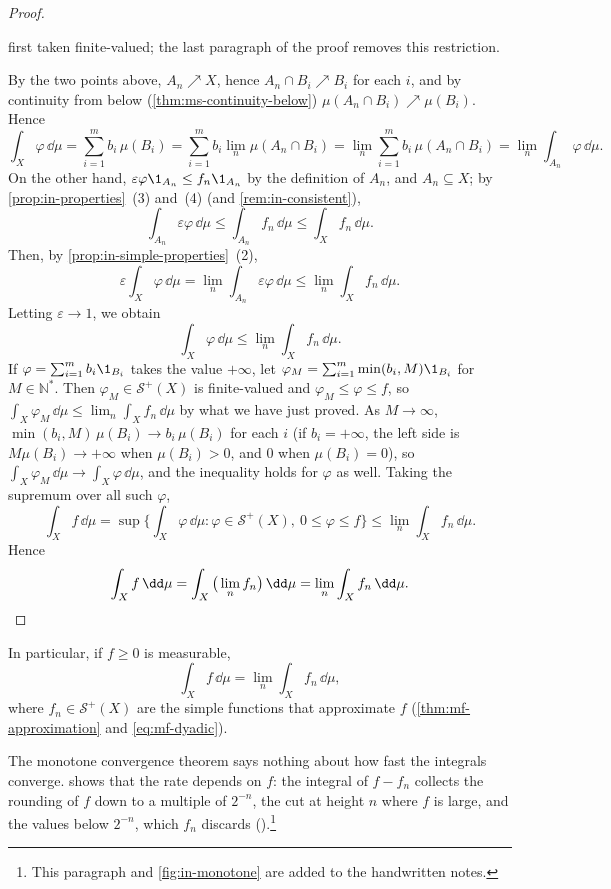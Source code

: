 \begin{proof}
\begin{itemize}
{    first taken finite-valued; the last paragraph of the proof removes this restriction.}
\end{itemize}
By the two points above, $A_n\nearrow X$, hence $A_n\cap B_i\nearrow B_i$ for each $i$, and by
continuity from below (\cref{thm:ms-continuity-below}) $\mu(A_n\cap B_i)\nearrow\mu(B_i)$. Hence
\[
  \int_X\varphi\,\dd\mu=\sum_{i=1}^mb_i\,\mu(B_i)=\sum_{i=1}^mb_i\lim_n\mu(A_n\cap B_i)
  =\lim_n\sum_{i=1}^mb_i\,\mu(A_n\cap B_i)=\lim_n\int_{A_n}\varphi\,\dd\mu .
\]
On the other hand, $\varepsilon\varphi\1_{A_n}\le f_n\1_{A_n}$ by the definition of $A_n$, and
$A_n\subseteq X$; by \cref{prop:in-properties}~(3) and~(4) (and \cref{rem:in-consistent}),
\[
  \int_{A_n}\varepsilon\varphi\,\dd\mu\le\int_{A_n}f_n\,\dd\mu\le\int_Xf_n\,\dd\mu .
\]
Then, by \cref{prop:in-simple-properties}~(2),
\[
  \varepsilon\int_X\varphi\,\dd\mu=\lim_n\int_{A_n}\varepsilon\varphi\,\dd\mu\le\lim_n\int_Xf_n\,\dd\mu .
\]
Letting $\varepsilon\to1$, we obtain
\[
  \int_X\varphi\,\dd\mu\le\lim_n\int_Xf_n\,\dd\mu .
\]
If $\varphi=\sum_{i=1}^mb_i\1_{B_i}$ takes the value $+\infty$, let
$\varphi_M=\sum_{i=1}^m\min(b_i,M)\1_{B_i}$ for $M\in\mathbb N^*$. Then $\varphi_M\in\mathcal S^+(X)$
is finite-valued and $\varphi_M\le\varphi\le f$, so $\int_X\varphi_M\,\dd\mu\le\lim_n\int_Xf_n\,\dd\mu$
by what we have just proved. As $M\to\infty$, $\min(b_i,M)\,\mu(B_i)\to b_i\,\mu(B_i)$ for each $i$
(if $b_i=+\infty$, the left side is $M\mu(B_i)\to+\infty$ when $\mu(B_i)>0$, and $0$ when
$\mu(B_i)=0$), so $\int_X\varphi_M\,\dd\mu\to\int_X\varphi\,\dd\mu$, and the inequality holds for
$\varphi$ as well. Taking the supremum over all such $\varphi$,
\[
  \int_Xf\,\dd\mu=\sup\Big\{\int_X\varphi\,\dd\mu:\varphi\in\mathcal S^+(X),\ 0\le\varphi\le f\Big\}
  \le\lim_n\int_Xf_n\,\dd\mu .
\]
Hence
\[
  \int_Xf\,\dd\mu=\int_X\big(\lim_nf_n\big)\,\dd\mu=\lim_n\int_Xf_n\,\dd\mu .\qedhere
\]
\end{proof}

\begin{remark}\label{rem:in-dyadic}
In particular, if $f\ge0$ is measurable,
\[
  \int_Xf\,\dd\mu=\lim_n\int_Xf_n\,\dd\mu ,
\]
where $f_n\in\mathcal S^+(X)$ are the simple functions that approximate $f$
(\cref{thm:mf-approximation} and \eqref{eq:mf-dyadic}).
\end{remark}

The monotone convergence theorem says nothing about how fast the integrals converge.
 shows that the rate depends on $f$: the integral of $f-f_n$ collects the
rounding of $f$ down to a multiple of $2^{-n}$, the cut at height $n$ where $f$ is large, and
the values below $2^{-n}$, which $f_n$ discards ().\footnote{This
paragraph and \cref{fig:in-monotone} are added to the handwritten notes.}

